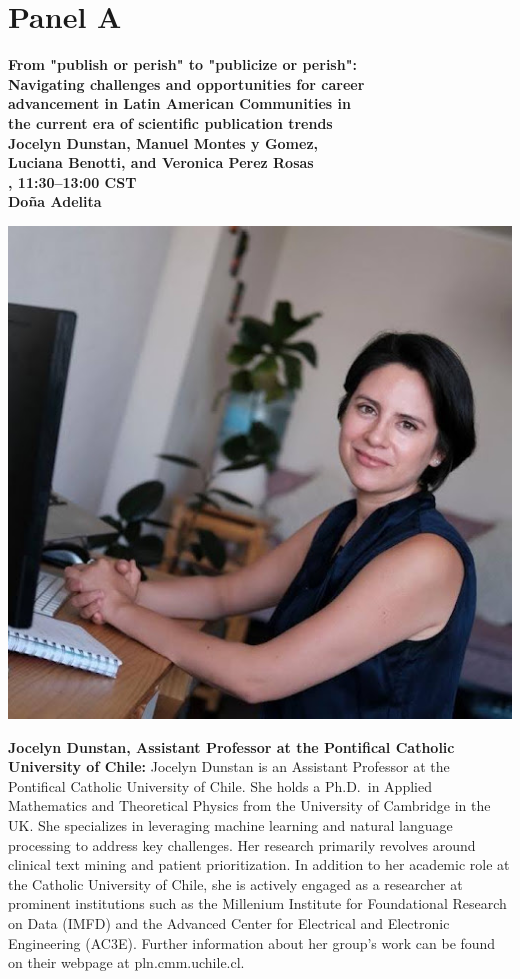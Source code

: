\newpage
{}
\section{Panel A}

\begin{center}
{\bfseries\Large From "publish or perish" to "publicize or perish":\\\vspace{2.0\lineskip}Navigating challenges and opportunities for career\\\vspace{2.0\lineskip}advancement in Latin American Communities in\\\vspace{2.0\lineskip}the current era of scientific publication trends} \\
\vspace{1.0em}
{\large\bf Jocelyn Dunstan, Manuel Montes y Gomez,\\\vspace{2.0\lineskip}Luciana Benotti, and Veronica Perez Rosas } \\

\textbf{\daydateyear{}, 11:30--13:00 CST}\\
\textbf{Do\~na Adelita}
\end{center}


\vspace{1em}
\begin{center}
\includegraphics[width=0.3\linewidth]{content/mexican_nlp/jocelyn.jpeg}
\end{center}
{\bfseries Jocelyn Dunstan, Assistant Professor at the Pontifical Catholic University of Chile:}
Jocelyn Dunstan is an Assistant Professor at the Pontifical Catholic University of Chile. She holds a Ph.D.~in Applied Mathematics and Theoretical Physics from the University of Cambridge in the UK. She specializes in leveraging machine learning and natural language processing to address key challenges. Her research primarily revolves around clinical text mining and patient prioritization. In addition to her academic role at the Catholic University of Chile, she is actively engaged as a researcher at prominent institutions such as the Millenium Institute for Foundational Research on Data (IMFD) and the Advanced Center for Electrical and Electronic Engineering (AC3E). Further information about her group's work can be found on their webpage at pln.cmm.uchile.cl.

